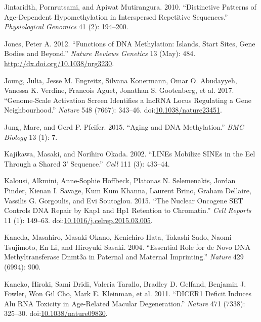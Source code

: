 \documentclass[onehalf,12pt]{beavtex}
\begin{document}
  \hypertarget{ref-JintaridthDistinctivepatternsagedependent2010}{}
  Jintaridth, Pornrutsami, and Apiwat Mutirangura. 2010. ``Distinctive
  Patterns of Age-Dependent Hypomethylation in Interspersed Repetitive
  Sequences.'' \emph{Physiological Genomics} 41 (2): 194--200.
  
  \hypertarget{ref-JonesFunctionsDNAmethylation2012}{}
  Jones, Peter A. 2012. ``Functions of DNA Methylation: Islands, Start
  Sites, Gene Bodies and Beyond.'' \emph{Nature Reviews Genetics} 13
  (May): 484. \url{http://dx.doi.org/10.1038/nrg3230}.
  
  \hypertarget{ref-JoungGenomescaleactivationscreen2017}{}
  Joung, Julia, Jesse M. Engreitz, Silvana Konermann, Omar O. Abudayyeh,
  Vanessa K. Verdine, Francois Aguet, Jonathan S. Gootenberg, et al. 2017.
  ``Genome-Scale Activation Screen Identifies a lncRNA Locus Regulating a
  Gene Neighbourhood.'' \emph{Nature} 548 (7667): 343--46.
  doi:\href{https://doi.org/10.1038/nature23451}{10.1038/nature23451}.
  
  \hypertarget{ref-JungAgingDNAmethylation2015}{}
  Jung, Marc, and Gerd P. Pfeifer. 2015. ``Aging and DNA Methylation.''
  \emph{BMC Biology} 13 (1): 7.
  
  \hypertarget{ref-KajikawaLINEsmobilizeSINEs2002}{}
  Kajikawa, Masaki, and Norihiro Okada. 2002. ``LINEs Mobilize SINEs in
  the Eel Through a Shared 3' Sequence.'' \emph{Cell} 111 (3): 433--44.
  
  \hypertarget{ref-KalousiNuclearOncogeneSET2015a}{}
  Kalousi, Alkmini, Anne-Sophie Hoffbeck, Platonas N. Selemenakis, Jordan
  Pinder, Kienan I. Savage, Kum Kum Khanna, Laurent Brino, Graham
  Dellaire, Vassilis G. Gorgoulis, and Evi Soutoglou. 2015. ``The Nuclear
  Oncogene SET Controls DNA Repair by Kap1 and Hp1 Retention to
  Chromatin.'' \emph{Cell Reports} 11 (1): 149--63.
  doi:\href{https://doi.org/10.1016/j.celrep.2015.03.005}{10.1016/j.celrep.2015.03.005}.
  
  \hypertarget{ref-KanedaEssentialrolenovo2004}{}
  Kaneda, Masahiro, Masaki Okano, Kenichiro Hata, Takashi Sado, Naomi
  Tsujimoto, En Li, and Hiroyuki Sasaki. 2004. ``Essential Role for de
  Novo DNA Methyltransferase Dnmt3a in Paternal and Maternal Imprinting.''
  \emph{Nature} 429 (6994): 900.
  
  \hypertarget{ref-KanekoDICER1deficitinduces2011}{}
  Kaneko, Hiroki, Sami Dridi, Valeria Tarallo, Bradley D. Gelfand,
  Benjamin J. Fowler, Won Gil Cho, Mark E. Kleinman, et al. 2011. ``DICER1
  Deficit Induces Alu RNA Toxicity in Age-Related Macular Degeneration.''
  \emph{Nature} 471 (7338): 325--30.
  doi:\href{https://doi.org/10.1038/nature09830}{10.1038/nature09830}.
  
\end{document}
